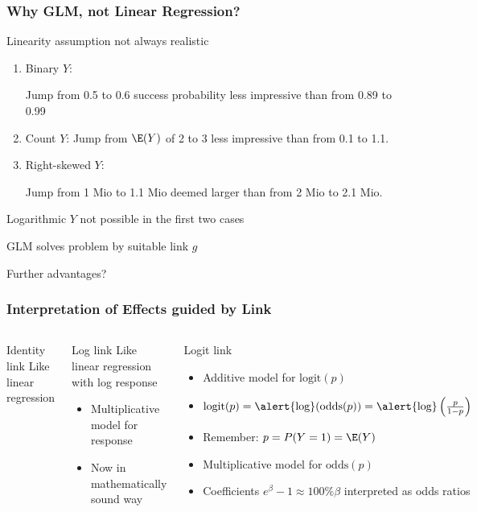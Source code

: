 \begin{frame}
	\frametitle{Why GLM, not Linear Regression?}
	\begin{block}{Linearity assumption not always realistic}
		\begin{enumerate}
			\item Binary $Y$: 
			
			Jump from 0.5 to 0.6 success probability less impressive than from 0.89 to 0.99
			\item Count $Y$: Jump from $\E(Y)$ of 2 to 3 less impressive than from 0.1 to 1.1.
			\item Right-skewed $Y$: 
			
			Jump from 1 Mio to 1.1 Mio deemed larger than from 2 Mio to 2.1 Mio.
		\end{enumerate}
		\alert{Logarithmic $Y$ not possible in the first two cases}
	\end{block}
	
	\vfill
	
	\begin{block}{GLM solves problem by suitable link $g$}
	\end{block}
	
	\vfill
	
	\begin{block}{Further advantages?}
	\end{block}
\end{frame}

\begin{frame}
	\frametitle{Interpretation of Effects guided by Link}
	\begin{columns}[onlytextwidth]
		\begin{block}{Identity link}
			Like linear regression
		\end{block}
		
		\begin{block}{Log link}
			Like linear regression with log response
			\begin{itemize}
				\item Multiplicative model for response
				\item Now in mathematically sound way
			\end{itemize}
		\end{block}
		
		\begin{block}{Logit link}
			\begin{itemize}
				\item Additive model for $\text{logit}(p)$
				\item $\text{logit}(p) = \text{\alert{log}}(\text{odds}(p)) = \text{\alert{log}}\left(\frac{p}{1-p}\right)$
				\item Remember: $p = P(Y=1) = \E(Y)$				
				\item Multiplicative model for $\text{odds}(p)$
				\item Coefficients \alert{$e^\beta - 1 \approx 100\%\beta$} interpreted as odds ratios
			\end{itemize}
		\end{block}
	\end{columns}
\end{frame}


